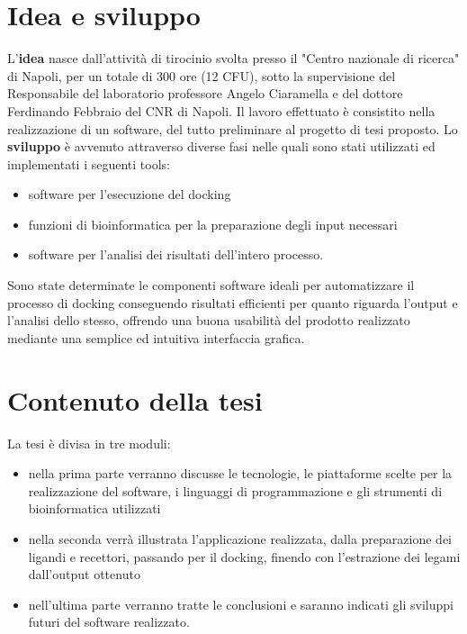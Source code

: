 \section{Idea e sviluppo}
L’\textbf{idea} nasce dall’attività di tirocinio svolta presso il "Centro nazionale di ricerca" di Napoli, per un totale di 300 ore (12 CFU), sotto la supervisione del Responsabile del laboratorio professore Angelo Ciaramella e del dottore Ferdinando Febbraio del CNR di Napoli. Il lavoro effettuato è consistito nella realizzazione di un software, del tutto preliminare al progetto di tesi proposto. Lo \textbf{sviluppo} è avvenuto attraverso diverse fasi nelle quali sono stati utilizzati ed implementati i seguenti tools: 

\begin{itemize}
    \item software per l'esecuzione del docking
    \item funzioni di bioinformatica per la preparazione degli input necessari
    \item software per l'analisi dei risultati dell'intero processo.
\end{itemize}

Sono state determinate le componenti software ideali per automatizzare il processo di docking conseguendo risultati efficienti per quanto riguarda l'output e l'analisi dello stesso, offrendo una buona usabilità del prodotto realizzato mediante una semplice ed intuitiva interfaccia grafica.

\section{Contenuto della tesi}
La tesi è divisa in tre moduli:

\begin{itemize}
    \item nella prima parte verranno discusse le tecnologie, le piattaforme scelte per la realizzazione del software, i linguaggi di programmazione e gli strumenti di bioinformatica utilizzati
    \item nella seconda verrà illustrata l'applicazione realizzata, dalla preparazione dei ligandi e recettori, passando per il docking, finendo con l'estrazione dei legami dall'output ottenuto
    \item nell'ultima parte verranno tratte le conclusioni e saranno indicati gli sviluppi futuri del software realizzato.
\end{itemize} 